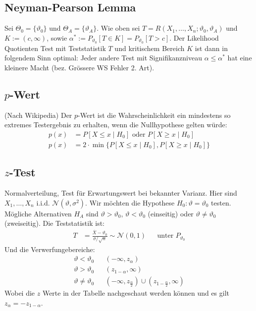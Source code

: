 \documentclass[8pt]{extarticle}
\newcommand{\vt}{\vartheta}
\newcommand{\cond}[2]{P[#1 \; | \; #2]}
\newcommand{\zufallsvariablen}{X_1, \dots, X_n}
\newcommand{\Standardnormalverteilt}{\mathcal{N}(0, 1)}
\begin{document}
\begin{multicols*}{3}
  \subsection*{Neyman-Pearson Lemma}
  Sei $\varTheta_0 = \{\vt_0\}$ und $\varTheta_A = \{\vt_A\}$. Wie oben sei
  $T = R(\zufallsvariablen; \vt_0, \vt_A)$ und $K := (c, \infty)$, sowie
  $\alpha^* := P_{\vt_0}[T \in K] = P_{\vt_0}[T > c]$. Der Likelihood
  Quotienten Test mit Teststatistik $T$ und kritischem Bereich $K$ ist dann
  in folgendem Sinn optimal: Jeder andere Test mit Signifikanzniveau
  $\alpha \leq \alpha^*$ hat eine kleinere Macht (bez. Grössere WS Fehler 2. Art).
  \subsection*{$p$-Wert}
  (Nach Wikipedia) Der $p$-Wert ist die Wahrscheinlichkeit ein mindestens
  so extremes Testergebnis zu erhalten, wenn die Nullhypothese gelten würde:
  \begin{align*}
    p(x) & = \cond{X \leq x}{H_0} \text{   oder   } \cond{X \geq x}{H_0}   \\
    p(x) & = 2 \cdot \min \{ \cond{X \leq x}{H_0}, \cond{X \geq x}{H_0} \}
  \end{align*}
  \subsection*{$z$-Test}
  Normalverteilung, Test für Erwartungswert bei bekannter Varianz.
  Hier sind $\zufallsvariablen$ i.i.d. $\mathcal{N}(\vt, \sigma^2)$.
  Wir möchten die Hypothese $H_0 : \vt = \vt_0$ testen. Mögliche Alternativen $H_A$
  sind $\vt > \vt_0$, $\vt < \vt_0$ (einseitig) oder $\vt \neq \vt_0$ (zweiseitig).
  Die Teststatistik ist:
  \begin{align*}
    T & = \frac{\overline{X} - \vt_0}{\sigma / \sqrt{n}} \sim \Standardnormalverteilt
      &                                                                               & \text{unter } P_{\vt_0}
  \end{align*}
  Und die Verwerfungebereiche:
  \begin{align*}
    \vt < \vt_0    &  & (-\infty, z_\alpha)                                                     \\
    \vt > \vt_0    &  & (z_{1 - \alpha}, \infty)                                                \\
    \vt \neq \vt_0 &  & (-\infty, z_{\frac{\alpha}{2}}) \cup (z_{1 - \frac{\alpha}{2}}, \infty)
  \end{align*}
  Wobei die $z$ Werte in der Tabelle nachgeschaut werden können
  und es gilt $z_\alpha = - z_{1 - \alpha}$.

\end{multicols*}
\end{document}
